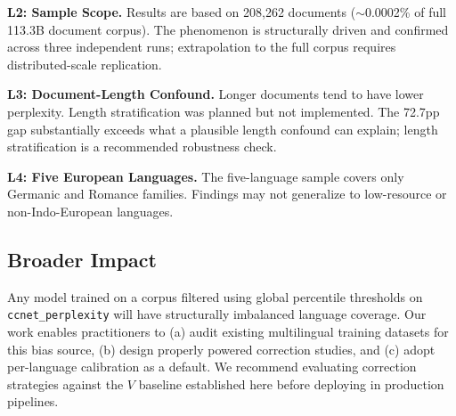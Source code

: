 \textbf{L2: Sample Scope.} Results are based on 208,262 documents ($\sim$0.0002\% of full 113.3B document corpus). The phenomenon is structurally driven and confirmed across three independent runs; extrapolation to the full corpus requires distributed-scale replication.

\textbf{L3: Document-Length Confound.} Longer documents tend to have lower perplexity. Length stratification was planned but not implemented. The 72.7pp gap substantially exceeds what a plausible length confound can explain; length stratification is a recommended robustness check.

\textbf{L4: Five European Languages.} The five-language sample covers only Germanic and Romance families. Findings may not generalize to low-resource or non-Indo-European languages.

\subsection{Broader Impact}

Any model trained on a corpus filtered using global percentile thresholds on \texttt{ccnet\_perplexity} will have structurally imbalanced language coverage. Our work enables practitioners to (a) audit existing multilingual training datasets for this bias source, (b) design properly powered correction studies, and (c) adopt per-language calibration as a default. We recommend evaluating correction strategies against the $V$ baseline established here before deploying in production pipelines.
